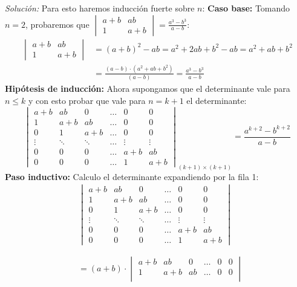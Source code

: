 \documentclass{article}
\newenvironment{solution}
    {\textit{Solución:}}
    {}
\begin{document}
\begin{solution}
    Para esto haremos inducción fuerte sobre $n$: \newline
    \textbf{Caso base:}
        Tomando $n=2$, probaremos que $\begin{vmatrix} a+b & ab \\ 1 &  a+b \end{vmatrix} =  \frac{a^3-b^3}{a-b}$:
        \[
    \begin{aligned}
    \begin{vmatrix} a+b & ab \\ 1 &  a+b \end{vmatrix} &= (a+b)^2 - ab = a^2 +2ab + b^2 - ab = a^2 + ab + b^2 \\
    &= \frac{(a-b)\cdot (a^2 + ab + b^2)}{(a-b)} = \frac{a^3-b^3}{a-b}
    \end{aligned}
        \]
    \textbf{Hipótesis de inducción:} 
    Ahora supongamos que el determinante vale para $n\leq k$ y con esto probar que vale para $n=k+1$ el determinante:
\[
\begin{vmatrix}
a+ b & ab & 0 & \dots & 0 & 0 \\
1 & a+b & ab & \dots & 0 & 0 \\
0 & 1 & a+b & \dots & 0 & 0 \\
\vdots & \ddots & \ddots & \dots & \vdots & \vdots \\
0 & 0 & 0 & \dots & a+b & ab \\
0 & 0 & 0 & \dots & 1 & a+b
\end{vmatrix}_{(k+1)\times(k+1)} =
\frac{a^{k+2}-b^{k+2}}{a-b}
\]
\textbf{Paso inductivo:} 
Calculo el determinante expandiendo por la fila 1:
\[
\begin{aligned}
& \begin{vmatrix}
a+ b & ab & 0 & \dots & 0 & 0 \\
1 & a+b & ab & \dots & 0 & 0 \\
0 & 1 & a+b & \dots & 0 & 0 \\
\vdots & \ddots & \ddots & \dots & \vdots & \vdots \\
0 & 0 & 0 & \dots & a+b & ab \\
0 & 0 & 0 & \dots & 1 & a+b
\end{vmatrix} \\ \\ \\
&= (a+b) \cdot
\begin{vmatrix}
a+ b & ab & 0 & \dots & 0 & 0 \\
1 & a+b & ab & \dots & 0 & 0 \\

\end{vmatrix}
\end{aligned}\]
\end{solution}
\end{document}
